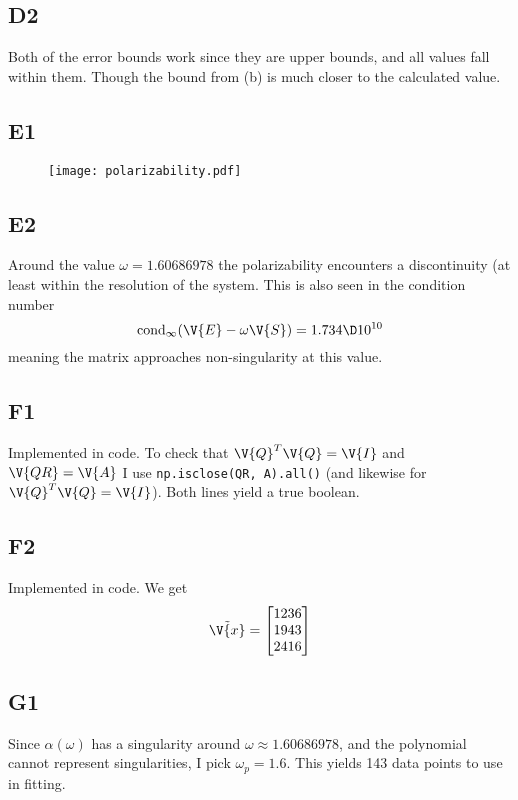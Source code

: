 \documentclass[a4paper,10pt]{article}
\begin{document}
	\subsection*{D2}
	Both of the error bounds work since they are upper bounds, and all values fall within them. Though the bound from (b) is much closer to the calculated value.
	
	\subsection*{E1}
	\begin{figure}[H]
		\centering
		\texttt{[image: polarizability.pdf]}
		\caption{}
		\label{fig:polarizability}
	\end{figure}
	
	
	\subsection*{E2}
	Around the value $ \omega=1.60686978 $ the polarizability encounters a discontinuity (at least within the resolution of the system. This is also seen in the condition number
	\begin{equation}\label{key}
		\text{cond}_{\infty} (\V{E}-\omega \V{S}) = 1.734 \D10^{10}
	\end{equation}
	meaning the matrix approaches non-singularity at this value.
	
	\subsection*{F1}
	Implemented in code. To check that $ \V{Q}^T \V{Q} = \V{I} $ and $ \V{QR}=\V{A} $ I use \texttt{np.isclose(QR, A).all()} (and likewise for $ \V{Q}^T \V{Q}=\V{I} $). Both lines yield a true boolean.
	
	\subsection*{F2}
	Implemented in code. We get
	\begin{equation}\label{key}
		\tilde{\V{x}} = \begin{bmatrix}
		1236 \\ 1943 \\ 2416
		\end{bmatrix}
	\end{equation}
	
	\subsection*{G1}
	Since $ \alpha(\omega) $ has a singularity around $ \omega \approx 1.60686978 $, and the polynomial cannot represent singularities, I pick $ \omega_p = 1.6 $. This yields 143 data points to use in fitting.
	
\end{document}
